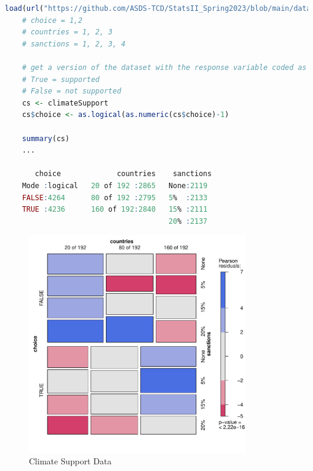 \documentclass[12pt,letterpaper]{article}
\begin{document}
    \begin{lstlisting}[language=R]
    load(url("https://github.com/ASDS-TCD/StatsII_Spring2023/blob/main/datasets/climateSupport.RData?raw=true"))
    # choice = 1,2
    # countries = 1, 2, 3
    # sanctions = 1, 2, 3, 4

    # get a version of the dataset with the response variable coded as 
    # True = supported
    # False = not supported
    cs <- climateSupport
    cs$choice <- as.logical(as.numeric(cs$choice)-1) 
    
    summary(cs)
    ...
    
       choice             countries    sanctions  
    Mode :logical   20 of 192 :2865   None:2119  
    FALSE:4264      80 of 192 :2795   5%  :2133  
    TRUE :4236      160 of 192:2840   15% :2111  
                                      20% :2137  
  \end{lstlisting}
  \begin{figure}[!htbp]
	    \includegraphics[width=0.85\textwidth]{graphics/cs.pdf}
	    \caption{Climate Support Data}
	    \label{fig:cs}
	\end{figure}
  \clearpage
\end{document}
